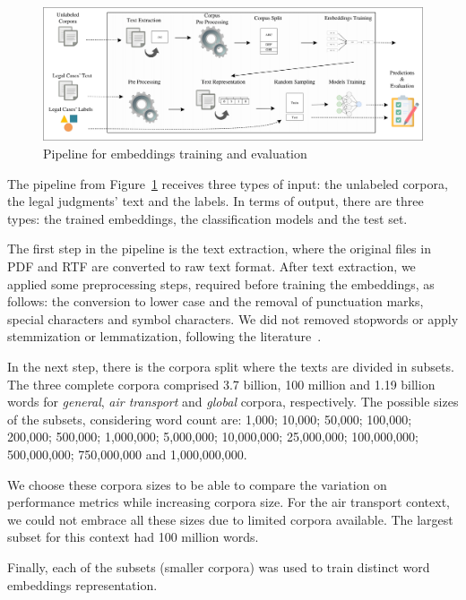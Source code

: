 \begin{figure}[htb]
    \centering
    \caption{Pipeline for embeddings training and evaluation}
    \label{fig:pipeline_embeddings}
    \includegraphics[width=\textwidth]{images/chapters/cap4_proposed_pipeline_embeddings.pdf}
\end{figure}


The pipeline from Figure~\ref{fig:pipeline_embeddings} receives three types of input: the unlabeled corpora, the legal judgments' text and the labels. In terms of output, there are three types: the trained embeddings, the classification models and the test set.

The first step in the pipeline is the text extraction, where the original files in \gls{PDF} and \gls{RTF} are converted to raw text format.
%
After text extraction, we applied some preprocessing steps, required before training the embeddings, as follows: the conversion to lower case and the removal of punctuation marks, special characters and symbol characters. We did not removed stopwords or apply stemmization or lemmatization, following the literature~\cite{Mikolov2013, Pennington2014}.


In the next step, there is the corpora split where the texts are divided in subsets. The three complete corpora comprised 3.7 billion, 100 million  and 1.19 billion words for \emph{general}, \emph{air transport} and \emph{global} corpora, respectively. The possible sizes of the subsets, considering word count are: 1,000; 10,000; 50,000; 100,000; 200,000; 500,000; 1,000,000; 5,000,000; 10,000,000; 25,000,000; 100,000,000; 500,000,000; 750,000,000 and 1,000,000,000.

We choose these corpora sizes to be able to compare the variation on performance metrics while increasing corpora size. For the air transport context, we could not embrace all these sizes due to limited corpora available. The largest subset for this context had 100 million words. 

Finally, each of the subsets (smaller corpora) was used to train distinct word embeddings representation.

